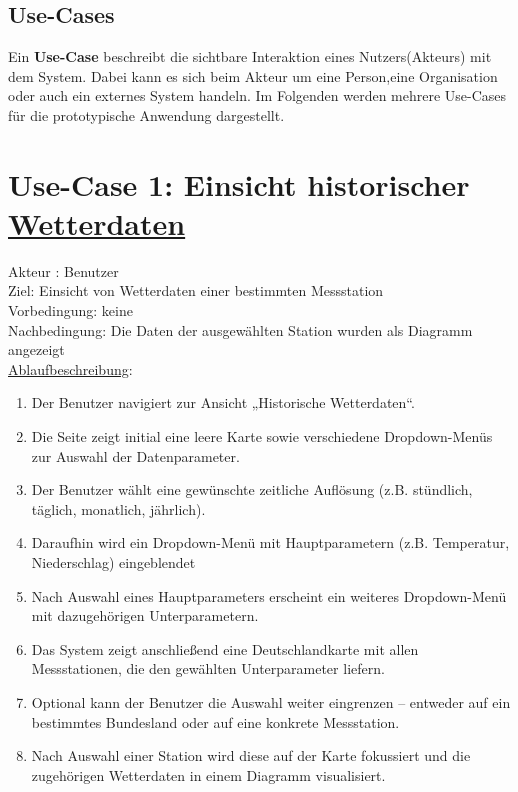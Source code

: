 \documentclass[a4paper,12pt]{scrreprt}
\begin{document}
	\subsection{Use-Cases}
	Ein \textbf{Use-Case} beschreibt die sichtbare Interaktion eines Nutzers(Akteurs) mit dem System. Dabei kann es sich beim Akteur um eine Person,eine Organisation oder auch ein externes System handeln. Im Folgenden werden mehrere Use-Cases für die prototypische Anwendung dargestellt.
	\section*{\small \textbf{Use-Case 1:  Einsicht historischer \href{https://wetterdienst.readthedocs.io/en/latest/} {Wetterdaten}}}
	Akteur : Benutzer\\
	Ziel: Einsicht von Wetterdaten einer bestimmten Messstation\\
	Vorbedingung: keine\\
	Nachbedingung: Die Daten der ausgewählten Station wurden als Diagramm angezeigt\\
	\underline{Ablaufbeschreibung}:
	\begin{enumerate}
		\item Der Benutzer navigiert zur Ansicht „Historische Wetterdaten“.
		\item Die Seite zeigt initial eine leere Karte sowie verschiedene Dropdown-Menüs zur Auswahl der Datenparameter.
		\item Der Benutzer wählt eine gewünschte zeitliche Auflösung (z.B. stündlich, täglich, monatlich, jährlich).
		\item Daraufhin wird ein Dropdown-Menü mit Hauptparametern (z.B. Temperatur, Niederschlag) eingeblendet
		\item Nach Auswahl eines Hauptparameters erscheint ein weiteres Dropdown-Menü mit dazugehörigen Unterparametern.
		\item Das System zeigt anschließend eine Deutschlandkarte mit allen Messstationen, die den gewählten Unterparameter liefern. 
		\item Optional kann der Benutzer die Auswahl weiter eingrenzen – entweder auf ein bestimmtes Bundesland oder auf eine konkrete Messstation.
		\item Nach Auswahl einer Station wird diese auf der Karte fokussiert und die zugehörigen Wetterdaten in einem Diagramm visualisiert. 
	\end{enumerate}
\end{document}
